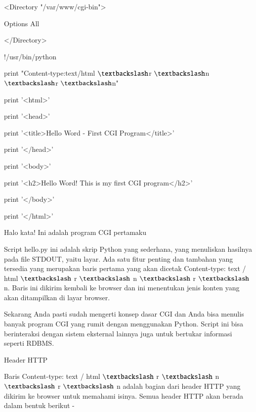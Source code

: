 \documentclass[a4paper,12pt]{report}
\begin{document}
\vspace{12pt}
\noindent 
<Directory "/var/www/cgi-bin"> \par
\noindent 
Options All \par
\noindent 
</Directory> \par
\vspace{12pt}
\noindent 
!/usr/bin/python \par
\vspace{12pt}
\noindent 
print "Content-type:text/html $  \textbackslash  $r $  \textbackslash  $n $  \textbackslash  $r $  \textbackslash  $n" \par
\noindent 
print '<html>' \par
\noindent 
print '<head>' \par
\noindent 
print '<title>Hello Word - First CGI Program</title>' \par
\noindent 
print '</head>' \par
\noindent 
print '<body>' \par
\noindent 
print '<h2>Hello Word! This is my first CGI program</h2>' \par
\noindent 
print '</body>' \par
\noindent 
print '</html>' \par
\vspace{12pt}
\vspace{12pt}
\noindent 
Halo kata! Ini adalah program CGI pertamaku \par
\vspace{12pt}
\noindent 
Script hello.py ini adalah skrip Python yang sederhana, yang menuliskan hasilnya pada file STDOUT, yaitu layar. Ada satu fitur penting dan tambahan yang tersedia yang merupakan baris pertama yang akan dicetak Content-type: text / html  $  \textbackslash  $ r  $  \textbackslash  $ n  $  \textbackslash  $ r  $  \textbackslash  $ n. Baris ini dikirim kembali ke browser dan ini menentukan jenis konten yang akan ditampilkan di layar browser. \par
\vspace{12pt}
\noindent 
Sekarang Anda pasti sudah mengerti konsep dasar CGI dan Anda bisa menulis banyak program CGI yang rumit dengan menggunakan Python. Script ini bisa berinteraksi dengan sistem eksternal lainnya juga untuk bertukar informasi seperti RDBMS. \par
\noindent 
Header HTTP \par
\vspace{12pt}
\noindent 
Baris Content-type: text / html  $  \textbackslash  $ r  $  \textbackslash  $ n  $  \textbackslash  $ r  $  \textbackslash  $ n adalah bagian dari header HTTP yang dikirim ke browser untuk memahami isinya. Semua header HTTP akan berada dalam bentuk berikut - \par
\end{document}
